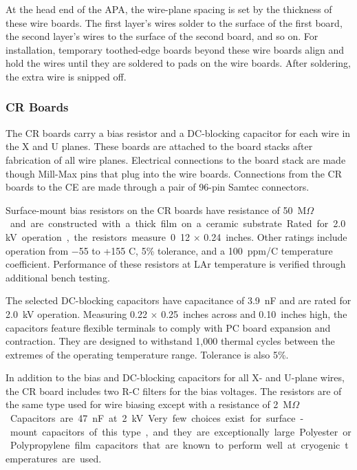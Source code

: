 At the head end of the APA, the wire-plane spacing is set by the thickness of these wire boards.  The first layer's wires solder to the surface of the first board, the second layer's wires to the surface of the second board, and so on.  For installation, temporary toothed-edge boards beyond these wire boards align and hold the wires until they are soldered to pads on the wire boards.  After soldering, the extra wire is snipped off. 



\subsubsection{CR Boards}
\label{sec:crboards}

The CR boards carry a bias resistor and a DC-blocking capacitor for each wire in the X and U planes. These boards are attached to the board stacks after fabrication of all wire planes.  Electrical connections to the board stack are made though Mill-Max pins that plug into the wire boards. Connections from the CR boards to the CE are made through a pair of 96-pin Samtec connectors.

Surface-mount bias resistors on the CR boards have resistance of \SI{50}{M$\Omega$} and are constructed with a thick film on a ceramic substrate. Rated for \SI{2.0}{kV} operation, the resistors measure 0.12 $\times$ \SI{0.24}{inches}. Other ratings include operation from $-$55 to +155 C, 5\% tolerance, and a \SI{100}{ppm/C} temperature coefficient. Performance of these resistors at LAr temperature is verified through additional bench testing.

The selected DC-blocking capacitors have capacitance of \SI{3.9}{nF} and are rated for \SI{2.0}{kV} operation. Measuring 0.22 $\times$ \SI{0.25}{inches} across and \SI{0.10}{inches} high, the capacitors feature flexible terminals to comply with PC board expansion and contraction. They are designed to withstand 1,000 thermal cycles between the extremes of the operating temperature range. Tolerance is also 5\%.

In addition to the bias and DC-blocking capacitors for all X- and U-plane wires, the CR board includes two R-C filters for the bias voltages. The resistors are of the same type used for wire biasing except with a resistance of \SI{2}{M$\Omega$}. Capacitors are \SI{47}{nF} at \SI{2}{kV}. Very few choices exist for surface-mount capacitors of this type, and they are exceptionally large. Polyester or Polypropylene film capacitors that are known to perform well at cryogenic temperatures are used.


